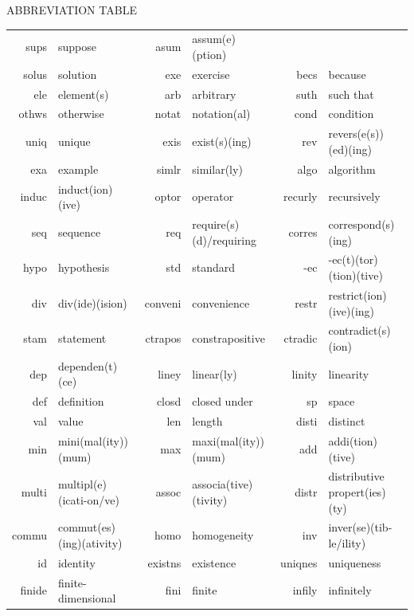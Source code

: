 {\begin{center}
\vspace{14pt}
{\large A{\footnotesize BBREVIATION} T{\footnotesize ABLE}}\vspace{8pt}\par
\begin{tabularx}{1.00\textwidth}{
		  r |
		| >{\raggedright\arraybackslash}X | r |
		| >{\raggedright\arraybackslash}X | r |
		| >{\raggedright\arraybackslash}X }
	\hline
sups&			suppose						& asum&			assum(e)(ption)				& \\
solus&			solution					& exe&			exercise					& becs&			because\\
ele&			element(s)					& arb&			arbitrary					& suth&			such that\\
othws&			otherwise					& notat&		notation(al)				& cond&			condition\\
uniq&			unique						& exis&			exist(s)(ing)				& rev&			revers(e(s))(ed)(ing)\\
exa&			example						& simlr&		similar(ly)					& algo&			algorithm\\
induc&			induct(ion)(ive)			& optor&		operator					& recurly&		recursively\\
seq&			sequence					& req&			require(s)(d)/requiring		& corres&		correspond(s)(ing)\\
hypo&			hypothesis					& std&			standard					& -ec&			-ec(t)(tor)(tion)(tive)\\
div&			div(ide)(ision)				& conveni&		convenience					& restr&		restrict(ion)(ive)(ing)\\
stam&			statement					& ctrapos&		constrapositive				& ctradic&		contradict(s)(ion)\\
dep&			dependen(t)(ce)				& liney&		linear(ly)					& linity&		linearity\\
def&			definition					& closd&		closed under				& sp&			space\\
val&			value						& len&			length						& disti&		distinct\\
min&			mini(mal(ity))(mum)			& max&			maxi(mal(ity))(mum)			& add&			addi(tion)(tive)\\
multi&			multipl(e)(icati-on/ve)		& assoc&		associa(tive)(tivity)		& distr&		distributive propert(ies)(ty)\\
commu&			commut(es)(ing)(ativity)	& homo&			homogeneity					& inv&			inver(se)(tib-le/ility)\\
id&				identity					& existns&		existence					& uniqnes&		uniqueness\\
finide&			finite-dimensional			& fini&			finite						& infily&		infinitely\\

\end{tabularx}
\end{center}}
